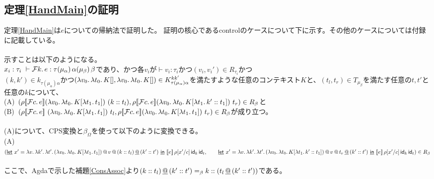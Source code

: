 \subsection{定理\ref{HandMain}の証明}
定理\ref{HandMain}は$e$についての帰納法で証明した。
証明の核心であるcontrolのケースについて下に示す。その他のケースについては付録に記載している。\\
\\
示すことは以下のようになる。\\
$x_i:\tau_i\ \vdash \Control{k}{e}:\tau \TrailType{\alpha} \TrailType{\beta}$であり、かつ各$v_i$が$\vdash v_i:\tau_i$かつ$(v_i,v_i') \in R_{\tau_i}$かつ\\
$(k,k')\in k_{\tau(\mu_{\alpha})\alpha}$かつ$(\Lam{v_0}{\Lam{t_0}{K[]}}, \Lam{v_0}{\Lam{t_0}{K[]}})\in  K^{kk'}_{\tau(\mu_{\alpha})\alpha}$を満たすような任意のコンテキスト$K$と、$(t_l, t_r) \in T_{\mu_{\beta}}$を満たす任意の$t, t'$と任意の$k$について、\\
  (A)\ $(\rho \CPSTh{\Control{c}{e}} \LamP{v_0}{\Lam{t_0}{K[\Lam{t_1}{t_1}]}}\ (\Cons{k}{t_l}), \rho \CPSTh{\Control{c}{e}} \LamP{v_0}{\Lam{t_0}{K[\Lam{t_1}{\Cons{k'}{t_1}}]}}\ t_r)\in R_{\beta}$と\\
(B)\ $(\rho \CPSTh{\Control{c}{e}}\ \LamP{v_0}{\Lam{t_0}{K[\Lam{t_1}{t_1}]}}\ t_l, \rho \CPSTh{\Control{c}{e}} \LamP{v_0}{\Lam{t_0}{K[\Lam{t_1}{t_1}]}}\ t_r)\in R_{\beta}$が成り立つ。\\
\\
(A)について、CPS変換と$\beta_{\Omega}$を使って以下のように変換できる。\\
(A)\ $(\DLet{x'}
      {\Lam{v}{\Lam{k'}{\Lam{t'}
        {\App{\App{\LamP{v_0}{\Lam{t_0}{K[\Lam{t_1}{t_1}]}}}{v}}{\DAppend{\ConsP{k}{t_l}}{\ConsP{k'}{t'}}}}}}}
      {\CPS{e}{\rho[\Change{c}{x'}]}{\Idk}{\Idt}},\\
\qquad   \DLet{x'}
      {\Lam{v}{\Lam{k'}{\Lam{t'}
        {\App{\App{\LamP{v_0}{\Lam{t_0}{K[\Lam{t_1}{\Cons{k'}{t_1}}]}}}{v}}{\DAppend{t_r}{\ConsP{k'}{t'}}}}}}}
      {\CPS{e}{\rho[\Change{c}{x'}]}{\Idk}{\Idt}})
      \in R_{\beta}$\\
\\
ここで、Agdaで示した補題\ref{ConsAssoc}より$\DAppend{\ConsP{k}{t_l}}{\ConsP{k'}{t'}} =_{\beta} \Cons{k}{(\DAppend{t_l}{\ConsP{k'}{t'}}})$である。\\
